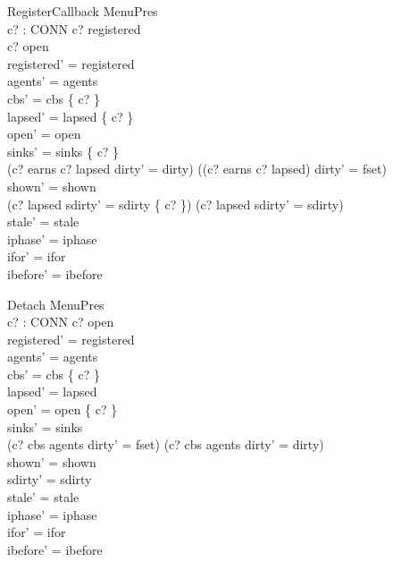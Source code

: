 \documentclass[a4paper,10pt,fleqn]{article}
\begin{document}
\begin{schema}{RegisterCallback}
  \Delta MenuPres \\
  c? : CONN
\where
  c? \in registered \\
  c? \in open \\
  registered' = registered \\
  agents' = agents \\
  cbs' = cbs \cup \{ c? \} \\
  lapsed' = lapsed \setminus \{ c? \} \\
  open' = open \\
  sinks' = sinks \oplus \{ c?  \} \\
  (c? \in earns \land c? \notin lapsed \land dirty' = dirty) \lor
    ((c? \notin earns \lor c? \in lapsed) \land dirty' = fset) \\
  shown' = shown \\
  (c? \in lapsed \land sdirty' = sdirty \cup \{ c? \}) \lor
    (c? \notin lapsed \land sdirty' = sdirty) \\
  stale' = stale \\
  iphase' = iphase \\
  ifor' = ifor \\
  ibefore' = ibefore
\end{schema}

\begin{schema}{Detach}
  \Delta MenuPres \\
  c? : CONN
\where
  c? \in open \\
  registered' = registered \\
  agents' = agents \\
  cbs' = cbs \setminus \{ c? \} \\
  lapsed' = lapsed \\
  open' = open \setminus \{ c? \} \\
  sinks' = sinks \\
  (c? \in cbs \setminus agents \land dirty' = fset) \lor
    (c? \notin cbs \setminus agents \land dirty' = dirty) \\
  shown' = shown \\
  sdirty' = sdirty \\
  stale' = stale \\
  iphase' = iphase \\
  ifor' = ifor \\
  ibefore' = ibefore
\end{schema}
\end{document}
